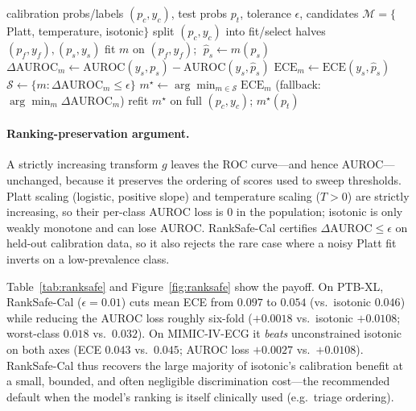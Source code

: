 \begin{algorithm}[t]
\caption{RankSafe-Cal (per class)}
\label{alg:ranksafe}
\begin{algorithmic}[1]
\Require calibration probs/labels $(p_c,y_c)$, test probs $p_t$, tolerance $\epsilon$,
  candidates $\mathcal{M}=\{$Platt, temperature, isotonic$\}$
\State split $(p_c,y_c)$ into fit/select halves $(p_f,y_f),(p_s,y_s)$
  \State fit $m$ on $(p_f,y_f)$; $\;\hat p_s \gets m(p_s)$
  \State $\Delta\mathrm{AUROC}_m \gets \mathrm{AUROC}(y_s,p_s)-\mathrm{AUROC}(y_s,\hat p_s)$ 
  \State $\mathrm{ECE}_m \gets \mathrm{ECE}(y_s,\hat p_s)$
\EndFor
\State $\mathcal{S}\gets\{m:\Delta\mathrm{AUROC}_m\le\epsilon\}$ 
\State $m^\star \gets \arg\min_{m\in\mathcal{S}} \mathrm{ECE}_m$ \quad(fallback: $\arg\min_m \Delta\mathrm{AUROC}_m$)
\State refit $m^\star$ on full $(p_c,y_c)$; \Return $m^\star(p_t)$
\end{algorithmic}
\end{algorithm}

\paragraph{Ranking-preservation argument.}
A strictly increasing transform $g$ leaves the ROC curve---and hence AUROC---unchanged,
because it preserves the ordering of scores used to sweep thresholds. Platt scaling
(logistic, positive slope) and temperature scaling ($T>0$) are strictly increasing, so their
per-class AUROC loss is $0$ in the population; isotonic is only weakly monotone and can lose
AUROC. RankSafe-Cal certifies $\Delta\mathrm{AUROC}\le\epsilon$ on held-out calibration data,
so it also rejects the rare case where a noisy Platt fit inverts on a low-prevalence class.

Table~\ref{tab:ranksafe} and Figure~\ref{fig:ranksafe} show the payoff. On PTB-XL,
RankSafe-Cal ($\epsilon{=}0.01$) cuts mean ECE from $0.097$ to $0.054$ (vs.\ isotonic
$0.046$) while reducing the AUROC loss roughly six-fold ($+0.0018$ vs.\ isotonic $+0.0108$;
worst-class $0.018$ vs.\ $0.032$). On MIMIC-IV-ECG it \emph{beats} unconstrained isotonic on
both axes (ECE $0.043$ vs.\ $0.045$; AUROC loss $+0.0027$ vs.\ $+0.0108$). RankSafe-Cal thus
recovers the large majority of isotonic's calibration benefit at a small, bounded, and often
negligible discrimination cost---the recommended default when the model's ranking is itself
clinically used (e.g.\ triage ordering).

